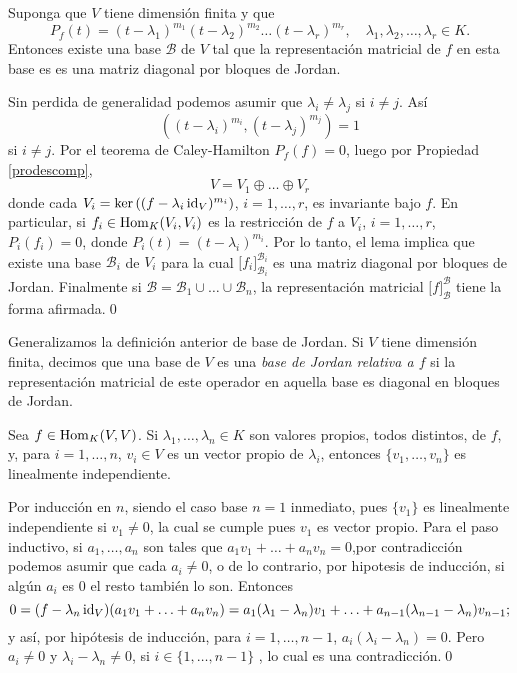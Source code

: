 \begin{teo}
Suponga que $V$ tiene dimensi\'on finita y que
\[
P_f(t)=(t-\lambda_1)^{m_1}(t-\lambda_2)^{m_2}\ldots(t-\lambda_r)^{m_r}, \quad \lambda_1,\lambda_2,\ldots,\lambda_r\in K.
\]
Entonces existe una base $\mathcal{B}$ de $V$ tal que la representaci\'on matricial de $f$ en esta base es
es una matriz diagonal por bloques de Jordan. 
\end{teo}

\dem Sin perdida de generalidad podemos asumir que $\lambda_i\ne\lambda_j$ si $i\ne j$. As\'i
\[
\left( (t-\lambda_i)^{m_i},(t-\lambda_j)^{m_j}\right)=1
\]
si $i\ne j$. Por el teorema de Caley-Hamilton $P_f(f)=0$, luego por Propiedad \ref{prodescomp},
\[
V=V_1\oplus \ldots \oplus V_r
\]
donde cada $V_i=\ker\left((f-\lambda_i\operatorname{id}_V)^{m_i}\right)$, $i=1,\ldots,r$, es invariante bajo $f$. En particular, si $f_i\in\operatorname{Hom}_K(V_i,V_i)$ es la restricci\'on de $f$ a $V_i$, $i=1,\ldots,r$, $P_i(f_i)=0$, donde $P_i(t)=(t-\lambda_i)^{m_i}$. Por lo tanto, el lema implica que existe una base $\mathcal{B}_i$ de $V_i$ para la cual $\Big[f_i\Big]^{\mathcal{B}_i}_{\mathcal{B}_i}$ es una matriz diagonal por bloques de Jordan. Finalmente si $\mathcal{B}=\mathcal{B}_1\cup\ldots\cup \mathcal{B}_n$, la representaci\'on matricial $\Big[f\Big]^{\mathcal{B}}_{\mathcal{B}}$ tiene la forma afirmada.\qed

\begin{defn}
Generalizamos la definici\'on anterior de base de Jordan. Si $V$ tiene dimensi\'on finita, decimos que una base de $V$ es una \emph{base de Jordan relativa a $f$} si la representaci\'on matricial de este operador en aquella base es diagonal en bloques de Jordan.
\end{defn}

\begin{lema}
Sea $f\in\operatorname{Hom}_K(V,V)$. Si $\lambda_1,\ldots,\lambda_n\in K$ son valores propios, todos distintos, de $f$, y, para $i=1,\ldots,n$, $v_i\in V$ es un vector propio de $\lambda_i$, entonces $\{v_1,\ldots,v_n\}$ es linealmente independiente. 
\end{lema}

\dem Por inducci\'on en $n$, siendo el caso base $n=1$ inmediato, pues $\{v_1\}$ es linealmente independiente si $v_1\ne 0$, la cual se cumple pues $v_1$ es vector propio. Para el paso inductivo, si $a_1,\ldots,a_n$ son tales que $a_1v_1+\ldots+a_nv_n=0$,por contradicci\'on podemos asumir que cada $a_i\ne 0$, o de lo contrario, por hipotesis de inducci\'on, si alg\'un $a_i$  es $0$ el resto tambi\'en lo son. Entonces
\[
0=(f-\lambda_n\operatorname{id}_V)(a_1v_1+\ldots+a_nv_n)=a_1(\lambda_1-\lambda_n)v_1+\ldots+a_{n-1}(\lambda_{n-1}-\lambda_n)v_{n-1};
\]
y as\'i, por hip\'otesis de inducci\'on, para $i=1,\ldots,n-1$, $a_i(\lambda_i-\lambda_n)=0$. Pero $a_i\ne 0$ y $\lambda_i-\lambda_n\ne 0$,  si $i\in\{1,\ldots,n-1\}$ , lo cual es una contradicci\'on.\qed

